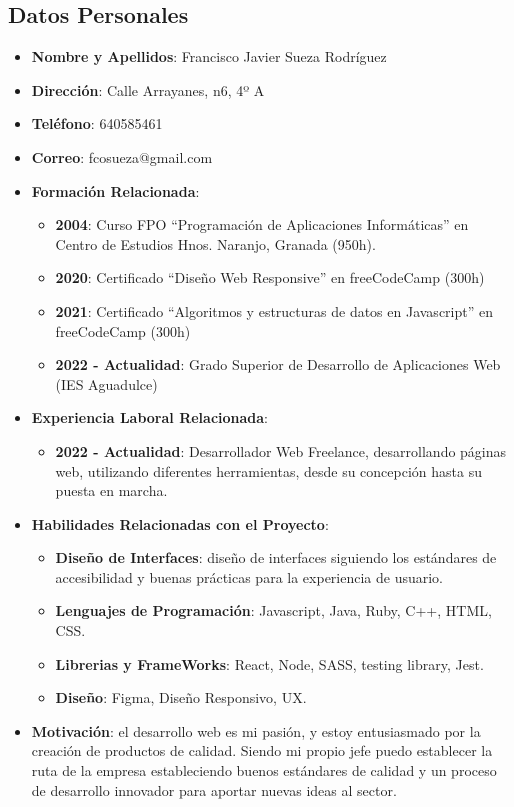 \subsection{Datos Personales}
\begin{itemize}
    \item \textbf{Nombre y Apellidos}: Francisco Javier Sueza Rodríguez
    \item \textbf{Dirección}: Calle Arrayanes, n6, 4º A
    \item \textbf{Teléfono}: 640585461
    \item \textbf{Correo}: fcosueza@gmail.com
    \item \textbf{Formación Relacionada}:
    \begin{itemize}
        \item \textbf{2004}: Curso FPO “Programación de Aplicaciones Informáticas” en Centro de Estudios Hnos.
        Naranjo, Granada (950h).
        \item \textbf{2020}: Certificado “Diseño Web Responsive” en freeCodeCamp (300h)
        \item \textbf{2021}: Certificado “Algoritmos y estructuras de datos en Javascript” en freeCodeCamp (300h)
        \item \textbf{2022 - Actualidad}: Grado Superior de Desarrollo de Aplicaciones Web (IES Aguadulce)
    \end{itemize}
    \item \textbf{Experiencia Laboral Relacionada}:
    \begin{itemize}
        \item \textbf{2022 - Actualidad}: Desarrollador Web Freelance, desarrollando páginas web, utilizando diferentes herramientas, desde su concepción hasta su puesta en marcha.
    \end{itemize}
    \item \textbf{Habilidades Relacionadas con el Proyecto}:
    \begin{itemize}
        \item \textbf{Diseño de Interfaces}: diseño de interfaces siguiendo los estándares de accesibilidad y buenas prácticas para la experiencia de usuario.
        \item \textbf{Lenguajes de Programación}: Javascript, Java, Ruby, C++, HTML, CSS.
        \item \textbf{Librerias y FrameWorks}: React, Node, SASS, testing library, Jest.
        \item \textbf{Diseño}: Figma, Diseño Responsivo, UX.
    \end{itemize}
    \item \textbf{Motivación}: el desarrollo web es mi pasión, y estoy entusiasmado por la creación de productos de calidad. Siendo mi propio jefe puedo establecer la ruta de la empresa estableciendo buenos estándares de calidad y un proceso de desarrollo innovador para aportar nuevas ideas al sector.
\end{itemize}

